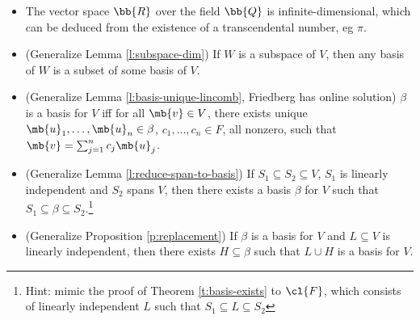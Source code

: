 \begin{exer}
\begin{itemize}
Let $V$ be a vector space.
\item The vector space $\bb{R}$ over the field $\bb{Q}$ is infinite-dimensional, which can be deduced from the existence of a transcendental number, eg $\pi$.
\item (Generalize Lemma \ref{l:subspace-dim}) If $W$ is a subspace of $V$, then any basis of $W$ is a subset of some basis of $V$.
\item (Generalize Lemma \ref{l:basis-unique-lincomb}, Friedberg has online solution) $\beta$ is a basis for $V$ iff for all $\mb{v}\in V$, there exists unique $\mb{u}_1, \ldots, \mb{u}_n \in \beta$, $c_1, \ldots,c_n \in F$, all nonzero, such that $\mb{v}= \sum_{j=1}^nc_j \mb{u}_j$.
\item (Generalize Lemma \ref{l:reduce-span-to-basis}) If $S_1 \subseteq S_2 \subseteq V$, $S_1$ is linearly independent and $S_2$ spans $V$, then there exists a basis $\beta$ for $V$ such that $S_1 \subseteq \beta \subseteq S_2$.\footnote{Hint: mimic the proof of Theorem \ref{t:basis-exists} to $\cl{F}$, which consists of linearly independent $L$ such that $S_1 \subseteq L \subseteq S_2$}
\item (Generalize Proposition \ref{p:replacement}) If $\beta$ is a basis for $V$ and $L \subseteq V$ is linearly independent, then there exists $H \subseteq \beta$ such that $L \cup H$ is a basis for $V$.
\end{itemize}
\end{exer}
